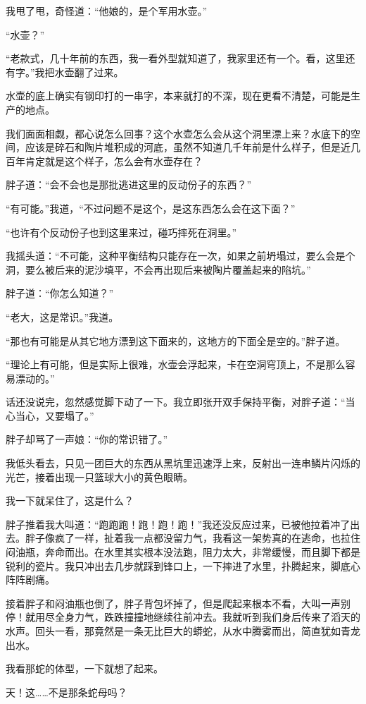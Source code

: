 我甩了甩，奇怪道：“他娘的，是个军用水壶。”

“水壶？”

“老款式，几十年前的东西，我一看外型就知道了，我家里还有一个。看，这里还有字。”我把水壶翻了过来。

水壶的底上确实有钢印打的一串字，本来就打的不深，现在更看不清楚，可能是生产的地点。

我们面面相觑，都心说怎么回事？这个水壶怎么会从这个洞里漂上来？水底下的空间，应该是碎石和陶片堆积成的河底，虽然不知道几千年前是什么样子，但是近几百年肯定就是这个样子，怎么会有水壶存在？

胖子道：“会不会也是那批逃进这里的反动份子的东西？”

“有可能。”我道，“不过问题不是这个，是这东西怎么会在这下面？”

“也许有个反动份子也到这里来过，碰巧摔死在洞里。”

我摇头道：“不可能，这种平衡结构只能存在一次，如果之前坍塌过，要么会是个洞，要么被后来的泥沙填平，不会再出现后来被陶片覆盖起来的陷坑。”

胖子道：“你怎么知道？”

“老大，这是常识。”我道。

“那也有可能是从其它地方漂到这下面来的，这地方的下面全是空的。”胖子道。

“理论上有可能，但是实际上很难，水壶会浮起来，卡在空洞穹顶上，不是那么容易漂动的。”

话还没说完，忽然感觉脚下动了一下。我立即张开双手保持平衡，对胖子道：“当心当心，又要塌了。”

胖子却骂了一声娘：“你的常识错了。”

我低头看去，只见一团巨大的东西从黑坑里迅速浮上来，反射出一连串鳞片闪烁的光芒，接着出现一只篮球大小的黄色眼睛。

我一下就呆住了，这是什么？

胖子推着我大叫道：“跑跑跑！跑！跑！跑！”我还没反应过来，已被他拉着冲了出去。胖子像疯了一样，扯着我一点都没留力气，我看这一架势真的在逃命，也拉住闷油瓶，奔命而出。在水里其实根本没法跑，阻力太大，非常缓慢，而且脚下都是锐利的瓷片。我只冲出去几步就踩到锋口上，一下摔进了水里，扑腾起来，脚底心阵阵剧痛。

接着胖子和闷油瓶也倒了，胖子背包坏掉了，但是爬起来根本不看，大叫一声别停！就用尽全身力气，跌跌撞撞地继续往前冲去。我就听到我们身后传来了滔天的水声。回头一看，那竟然是一条无比巨大的蟒蛇，从水中腾雾而出，简直犹如青龙出水。

我看那蛇的体型，一下就想了起来。

天！这……不是那条蛇母吗？

